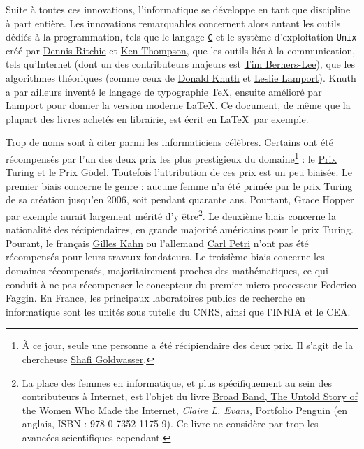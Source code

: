 \documentclass[10pt]{article}
\begin{document}
Suite à toutes ces innovations, l'informatique se développe en tant que discipline à part entière. Les innovations remarquables concernent
alors autant les outils dédiés à la programmation, tels que le langage
\href{https://en.wikipedia.org/wiki/C_(programming_language)}{\texttt{C}} et le système d'exploitation \texttt{Unix}
créé par \href{https://en.wikipedia.org/wiki/Dennis_Ritchie}{Dennis Ritchie}
et \href{https://en.wikipedia.org/wiki/Ken_Thompson}{Ken Thompson}, que les outils liés à la communication, tels qu'Internet
(dont un des contributeurs majeurs est \href{https://fr.wikipedia.org/wiki/Tim_Berners-Lee}{Tim Berners-Lee}), 
que les algorithmes théoriques (comme ceux de \href{https://fr.wikipedia.org/wiki/Donald_Knuth}{Donald Knuth} et \href{https://fr.wikipedia.org/wiki/Leslie_Lamport}{Leslie Lamport}).
Knuth a par ailleurs inventé le langage de typographie \TeX, ensuite amélioré par Lamport pour donner la version moderne \LaTeX.
Ce document, de même que la plupart des livres achetés en librairie, est écrit en \LaTeX~par exemple.

Trop de noms sont à citer parmi les informaticiens célèbres. Certains ont été récompensés par l'un des deux prix les plus prestigieux du domaine\footnote{
  À ce jour, seule une personne a été récipiendaire des deux prix. Il s'agit de la chercheuse \href{https://fr.wikipedia.org/wiki/Shafi_Goldwasser}{Shafi Goldwasser}.
} :
le \href{https://fr.wikipedia.org/wiki/Prix_Turing}{Prix Turing} et le \href{https://fr.wikipedia.org/wiki/Prix_G\%C3\%B6del}{Prix Gödel}.
Toutefois l'attribution de ces prix est un peu biaisée. Le premier biais concerne le genre : aucune femme n'a été primée par le prix Turing de
sa création jusqu'en 2006, soit pendant quarante ans. Pourtant, Grace Hopper par exemple aurait largement mérité d'y être\footnote{
  La place des femmes en informatique, et plus spécifiquement au sein des contributeurs à Internet, est l'objet du livre
  \underline{Broad Band, The Untold Story of the Women Who Made the Internet}, \textit{Claire L. Evans}, Portfolio Penguin
  (en anglais, ISBN : 978-0-7352-1175-9). Ce livre ne considère par trop les avancées scientifiques cependant.
}. Le deuxième biais
concerne la nationalité des récipiendaires, en grande majorité américains pour le prix Turing. Pourant, le français \href{https://fr.wikipedia.org/wiki/Gilles_Kahn}{Gilles Kahn}
ou l'allemand \href{https://fr.wikipedia.org/wiki/Carl_Adam_Petri}{Carl Petri} n'ont pas été récompensés pour leurs travaux fondateurs.
Le troisième biais concerne les domaines récompensés, majoritairement proches des mathématiques, ce qui conduit à ne pas récompenser le concepteur du premier
micro-processeur Federico Faggin. En France, les principaux laboratoires publics de recherche en informatique sont les unités sous tutelle du CNRS,
ainsi que l'INRIA et le CEA.
\end{document}
